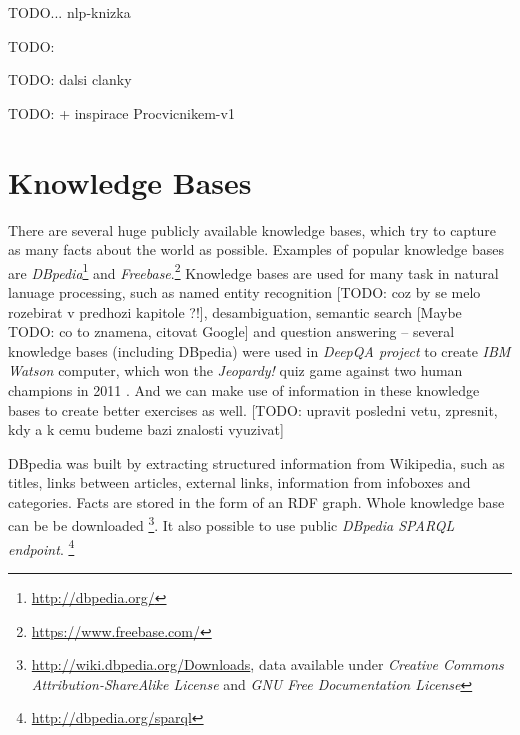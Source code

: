 \documentclass[a4paper, 12pt, twoside]{fithesis2}		%
\renewcommand{\_}{\leavevmode \kern0.07em\vbox{\hrule width0.4em}}
\begin{document}
TODO... nlp-knizka

TODO: \parencite{triples-acquisition}

TODO: dalsi clanky

TODO: + inspirace Procvicnikem-v1

\section{Knowledge Bases}
\label{sec:knowledge-bases}

There are several huge publicly available knowledge bases,
which try to capture as many facts about the world as possible.
Examples of popular knowledge bases are
\textit{DBpedia}\footnote{\url{http://dbpedia.org/}}
and \textit{Freebase}.\footnote{\url{https://www.freebase.com/}}
Knowledge bases are used for many task in natural lanuage processing,
such as named entity recognition [TODO: coz by se melo rozebirat v predhozi kapitole ?!],
desambiguation,
semantic search [Maybe TODO: co to znamena, citovat Google]
and question answering -- several knowledge bases (including DBpedia) were used in \emph{DeepQA project} to create \emph{IBM Watson} computer, which won the \emph{Jeopardy!} quiz game against two human champions in 2011 \cite{watson}. And we can make use of information in these knowledge bases to create better exercises as well. [TODO: upravit posledni vetu, zpresnit, kdy a k cemu budeme bazi znalosti vyuzivat]

DBpedia was built by extracting structured information from Wikipedia,
such as titles, links between articles, external links, information from infoboxes and categories.
Facts are stored in the form of an RDF graph.
Whole knowledge base can be be downloaded%
\footnote{\url{http://wiki.dbpedia.org/Downloads}, %
data available under \emph{Creative Commons Attribution-ShareAlike License}
and \emph{GNU Free Documentation License}}.
It also possible to use public \textit{DBpedia SPARQL endpoint}.%
\footnote{\url{http://dbpedia.org/sparql}}
\end{document}

